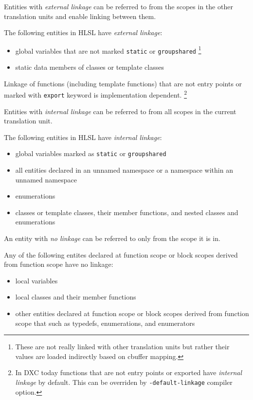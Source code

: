 \p Entities with \textit{external linkage} can be referred to from the scopes in
the other translation units and enable linking between them.

\p The following entities in HLSL have \textit{external linkage}:
\begin{itemize}
  \item global variables that are not marked \texttt{static} or
  \texttt{groupshared} \footnote{These are not really linked with other
  translation units but rather their values are loaded indirectly based on
  cbuffer mapping.}
  \item static data members of classes or template classes
\end{itemize}

\p Linkage of functions (including template functions) that are not entry points
or marked with \texttt{export} keyword is implementation dependent. \footnote{In
DXC today functions that are not entry points or exported have \textit{internal
linkage} by default. This can be overriden by \texttt{-default-linkage} compiler
option.}


\p Entities with \textit{internal linkage} can be referred to from all scopes in
the current translation unit.

\p The following entities in HLSL have \textit{internal linkage}:
\begin{itemize}
  \item global variables marked as \texttt{static} or \texttt{groupshared}
  \item all entities declared in an unnamed namespace or a namespace within an
  unnamed namespace
  \item enumerations
  \item classes or template classes, their member functions, and nested classes
  and enumerations
\end{itemize}


\p An entity with \textit{no linkage} can be referred to only from the scope it
is in.

\p Any of the following entites declared at function scope or block scopes
derived from function scope have no linkage:
\begin{itemize}
  \item local variables
  \item local classes and their member functions
  \item other entities declared at function scope or block scopes derived from
  function scope that such as typedefs, enumerations, and enumerators
\end{itemize}

